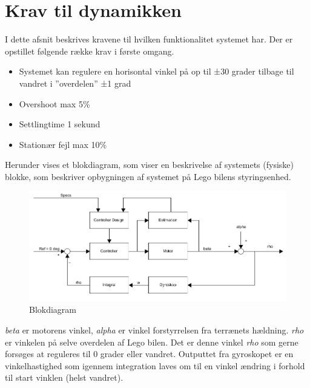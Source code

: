 \section{Krav til dynamikken}

I dette afsnit beskrives kravene til hvilken funktionalitet systemet har. Der er opstillet følgende række krav i første omgang.
\begin{itemize}
	\item Systemet kan regulere en horisontal vinkel på op til ±30 grader tilbage til vandret i ”overdelen” ±1 grad
	\item Overshoot max 5\%
	\item Settlingtime 1 sekund 
	\item Stationær fejl max 10\%  
	
\end{itemize}



Herunder vises et blokdiagram, som viser en beskrivelse af systemets (fysiske) blokke, som beskriver opbygningen af systemet på Lego bilens styringsenhed. 


\begin{figure}[H]
	\centering
	\includegraphics[width = 400 pt]{figur/blokdiagram.png}
	\caption{Blokdiagram}
	\label{fig:Blokdiagram}
\end{figure}

\textit{beta} er motorens vinkel,\textit{ alpha} er vinkel forstyrrelsen fra terrænets hældning. \textit{rho} er vinkelen på selve overdelen af Lego bilen. Det er denne vinkel \textit{rho} som gerne forsøges at reguleres til 0 grader eller vandret. Outputtet fra gyroskopet er en vinkelhastighed som igennem integration laves om til en vinkel ændring i forhold til start vinklen (helst vandret). 